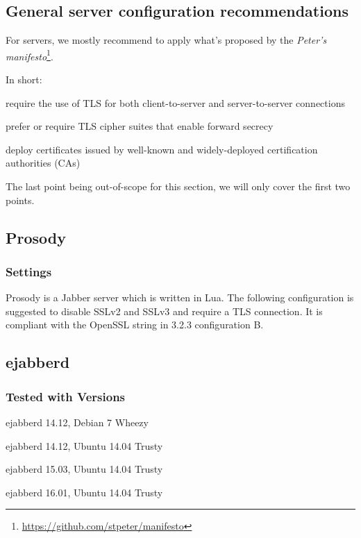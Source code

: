 \gdef\currentsectionname{IM}
\subsection{General server configuration recommendations}

For servers, we mostly recommend to apply what's proposed by the \emph{Peter's manifesto}\footnote{\url{https://github.com/stpeter/manifesto}}.

In short:
\begin{itemize*}
    \item require the use of TLS for both client-to-server and server-to-server connections
    \item prefer or require TLS cipher suites that enable forward secrecy
    \item deploy certificates issued by well-known and widely-deployed certification authorities (CAs)
\end{itemize*}

The last point being out-of-scope for this section, we will only cover the first two points.


\subsection{Prosody}
\subsubsection{Settings}
Prosody is a Jabber server which is written in Lua. 
The following configuration is suggested to disable SSLv2 and SSLv3 and require a TLS connection. It is compliant with the OpenSSL string in 3.2.3 configuration B.




\subsection{ejabberd}

\subsubsection{Tested with Versions}
\begin{itemize*}
  \item ejabberd 14.12, Debian 7 Wheezy
  \item ejabberd 14.12, Ubuntu 14.04 Trusty
  \item ejabberd 15.03, Ubuntu 14.04 Trusty
  \item ejabberd 16.01, Ubuntu 14.04 Trusty
\end{itemize*}

